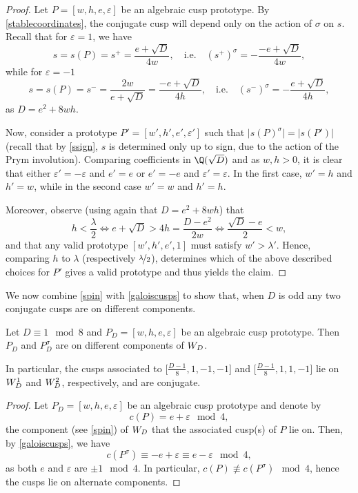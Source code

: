 \documentclass{amsart}
\def\ep{\varepsilon}
\def\abs#1{\lvert#1\rvert}
\begin{document}
\begin{proof}
Let $P=[w,h,e,\ep]$ be an algebraic cusp prototype. 
By \autoref{stablecoordinates}, the conjugate cusp will depend only on the action of $\sigma$ on $s$. Recall that for $\ep=1$, we have
\[s=s(P)=s^+=\frac{e+\sqrt{D}}{4w},\quad\text{i.e.}\quad (s^+)^\sigma=-\frac{-e+\sqrt{D}}{4w},\]
while for $\ep=-1$
\[s=s(P)=s^-=\frac{2w}{e+\sqrt{D}}=\frac{-e+\sqrt{D}}{4h},\quad\text{i.e.}\quad (s^-)^\sigma=-\frac{e+\sqrt{D}}{4h},\]
as $D=e^2+8wh$.

Now, consider a prototype $P'=[w',h',e',\ep']$ such that $\abs{s(P)^\sigma}=\abs{s(P')}$ (recall that by \autoref{ssign}, $s$ is determined only up to sign, due to the action of the Prym involution). Comparing coefficients in $\Q(\sqrt{D})$ and as $w,h>0$, it is clear that either $\ep'=-\ep$ and $e'=e$ or $e'=-e$ and $\ep'=\ep$. In the first case, $w'=h$ and $h'=w$, while in the second case $w'=w$ and $h'=h$.

Moreover, observe (using again that $D=e^2+8wh$) that
\[h<\frac{\lambda}{2}\iff e+\sqrt{D}>4h=\frac{D-e^2}{2w}%
\iff \frac{\sqrt{D}-e}{2}<w,\]
and that any valid prototype $[w',h',e',1]$ must satisfy $w'>\lambda'$.
Hence, comparing $h$ to $\lambda$ (respectively $\nicefrac{\lambda}{2}$), determines which of the above described choices for $P'$ gives a valid prototype and thus yields the claim.
\end{proof}


We now combine \autoref{spin} with \autoref{galoiscusps} to show that, when $D$ is odd any two conjugate cusps are on different components.

\begin{prop}\label{switching}
Let $D\equiv 1\mod 8$ and $P_D=[w,h,e,\ep]$ be an algebraic cusp prototype. Then $P_D$ and $P_D^\sigma$ are on different components of $\W$. 

In particular, the cusps associated to $\bigl[\frac{D-1}{8},1,-1,-1\bigr]$ and $\bigl[\frac{D-1}{8},1,1,-1\bigr]$ lie on $\W^1$ and $\W^2$, respectively, and are conjugate.
\end{prop}

\begin{proof}
Let $P_D=[w,h,e,\ep]$ be an algebraic cusp prototype and denote by
\[c(P)=e+\ep\mod 4,\]
the component (see \autoref{spin}) of $\W$ that the associated cusp(s) of $P$ lie on. Then, by \autoref{galoiscusps}, we have
\[c(P^\sigma)\equiv -e+\ep\equiv e-\ep\mod 4,\]
as both $e$ and $\ep$ are $\pm 1\mod 4$. In particular, $c(P)\not\equiv c(P^\sigma)\mod 4$, hence the cusps lie on alternate components.
\end{proof}
\end{document}
